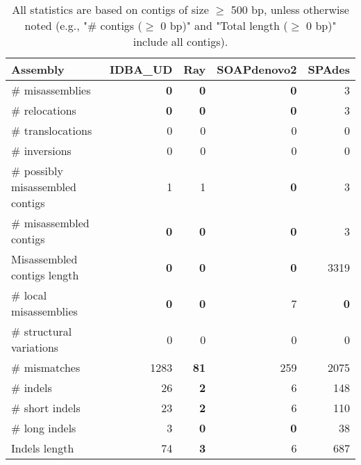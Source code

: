 \documentclass[12pt,a4paper]{article}
\begin{document}
\begin{table}[ht]
\begin{center}
\caption{All statistics are based on contigs of size $\geq$ 500 bp, unless otherwise noted (e.g., "\# contigs ($\geq$ 0 bp)" and "Total length ($\geq$ 0 bp)" include all contigs).}
\begin{tabular}{|l*{4}{|r}|}
\hline
Assembly & IDBA\_UD & Ray & SOAPdenovo2 & SPAdes \\ \hline
\# misassemblies & {\bf 0} & {\bf 0} & {\bf 0} & 3 \\ \hline
\hspace{5mm}\# relocations & {\bf 0} & {\bf 0} & {\bf 0} & 3 \\ \hline
\hspace{5mm}\# translocations & 0 & 0 & 0 & 0 \\ \hline
\hspace{5mm}\# inversions & 0 & 0 & 0 & 0 \\ \hline
\# possibly misassembled contigs & 1 & 1 & {\bf 0} & 3 \\ \hline
\# misassembled contigs & {\bf 0} & {\bf 0} & {\bf 0} & 3 \\ \hline
Misassembled contigs length & {\bf 0} & {\bf 0} & {\bf 0} & 3319 \\ \hline
\# local misassemblies & {\bf 0} & {\bf 0} & 7 & {\bf 0} \\ \hline
\# structural variations & 0 & 0 & 0 & 0 \\ \hline
\# mismatches & 1283 & {\bf 81} & 259 & 2075 \\ \hline
\# indels & 26 & {\bf 2} & 6 & 148 \\ \hline
\hspace{5mm}\# short indels & 23 & {\bf 2} & 6 & 110 \\ \hline
\hspace{5mm}\# long indels & 3 & {\bf 0} & {\bf 0} & 38 \\ \hline
Indels length & 74 & {\bf 3} & 6 & 687 \\ \hline
\end{tabular}
\end{center}
\end{table}
\end{document}
